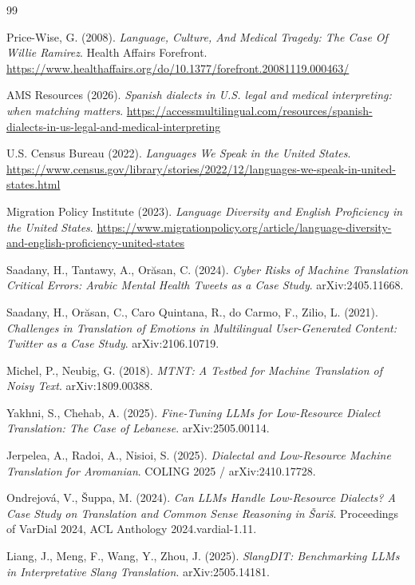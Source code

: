 \documentclass[11pt,a4paper]{article}
\begin{document}
\begin{thebibliography}{99}

 Price-Wise, G. (2008). \textit{Language, Culture, And Medical Tragedy: The Case Of Willie Ramirez}. Health Affairs Forefront. \url{https://www.healthaffairs.org/do/10.1377/forefront.20081119.000463/}

 AMS Resources (2026). \textit{Spanish dialects in U.S. legal and medical interpreting: when matching matters}. \url{https://accessmultilingual.com/resources/spanish-dialects-in-us-legal-and-medical-interpreting}

 U.S. Census Bureau (2022). \textit{Languages We Speak in the United States}. \url{https://www.census.gov/library/stories/2022/12/languages-we-speak-in-united-states.html}

 Migration Policy Institute (2023). \textit{Language Diversity and English Proficiency in the United States}. \url{https://www.migrationpolicy.org/article/language-diversity-and-english-proficiency-united-states}

 Saadany, H., Tantawy, A., Orăsan, C. (2024). \textit{Cyber Risks of Machine Translation Critical Errors: Arabic Mental Health Tweets as a Case Study}. arXiv:2405.11668.

 Saadany, H., Orăsan, C., Caro Quintana, R., do Carmo, F., Zilio, L. (2021). \textit{Challenges in Translation of Emotions in Multilingual User-Generated Content: Twitter as a Case Study}. arXiv:2106.10719.

 Michel, P., Neubig, G. (2018). \textit{MTNT: A Testbed for Machine Translation of Noisy Text}. arXiv:1809.00388.

 Yakhni, S., Chehab, A. (2025). \textit{Fine-Tuning LLMs for Low-Resource Dialect Translation: The Case of Lebanese}. arXiv:2505.00114.

 Jerpelea, A., Radoi, A., Nisioi, S. (2025). \textit{Dialectal and Low-Resource Machine Translation for Aromanian}. COLING 2025 / arXiv:2410.17728.

 Ondrejová, V., Šuppa, M. (2024). \textit{Can LLMs Handle Low-Resource Dialects? A Case Study on Translation and Common Sense Reasoning in Šariš}. Proceedings of VarDial 2024, ACL Anthology 2024.vardial-1.11.

 Liang, J., Meng, F., Wang, Y., Zhou, J. (2025). \textit{SlangDIT: Benchmarking LLMs in Interpretative Slang Translation}. arXiv:2505.14181.


\end{thebibliography}
\end{document}
